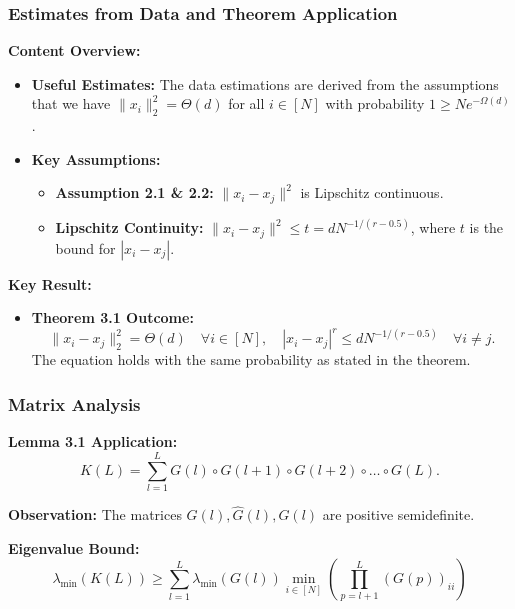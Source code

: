 \documentclass[serif, aspectratio=169]{beamer}
\begin{document}
\begin{frame}
\frametitle{Estimates from Data and Theorem Application}

\textbf{Content Overview:}
\begin{itemize}
	\item \textbf{Useful Estimates:}
	The data estimations are derived from the assumptions that we have \( \| x_i \|^2_2 = \Theta(d) \) for all \( i \in [N] \) with probability \( 1 \geq N e^{-\Omega(d)} \).
	\item \textbf{Key Assumptions:}
	\begin{itemize}
		\item \textbf{Assumption 2.1 \& 2.2:} \( \| x_i - x_j \|^2 \) is Lipschitz continuous.
		\item \textbf{Lipschitz Continuity:} \( \| x_i - x_j \|^2 \leq t = dN^{-1/(r-0.5)} \), where \( t \) is the bound for \( |x_i - x_j| \).
	\end{itemize}
\end{itemize}

\vspace{0.5cm}

\textbf{Key Result:}
\begin{itemize}
	\item \textbf{Theorem 3.1 Outcome:}  
	\[
	\| x_i - x_j \|^2_2 = \Theta(d) \quad \forall i \in [N], \quad |x_i - x_j|^{r} \leq dN^{-1/(r-0.5)} \quad \forall i \neq j.
	\]
	The equation holds with the same probability as stated in the theorem.
\end{itemize}

\end{frame}

\begin{frame}
\frametitle{Matrix Analysis}

\textbf{Lemma 3.1 Application:}
\[
K(L) = \sum_{l=1}^{L} G(l) \circ G(l+1) \circ G(l+2) \circ \dots \circ G(L).
\]

\textbf{Observation:} The matrices \( G(l), \hat{G}(l), G(l) \) are positive semidefinite.

\vspace{0.5cm}

\textbf{Eigenvalue Bound:}
\[
\lambda_{\min}( K(L) ) \geq \sum_{l=1}^{L} \lambda_{\min}( G(l) ) \min_{i \in [N]} \left( \prod_{p=l+1}^L (G(p))_{ii} \right)
\]

\end{frame}
\end{document}
